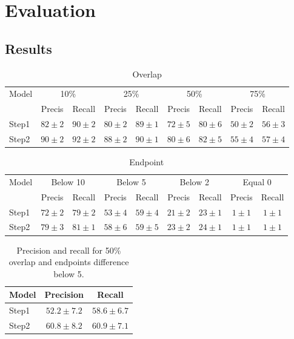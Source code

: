 \section{Evaluation}

\subsection{Results}

\begin{table}
	\centering 
	\begin{tabular}{l|c|c|c|c|c|c|c|c} 
		Model & \multicolumn{2}{|c}{10\%}& \multicolumn{2}{|c}{25\%}& \multicolumn{2}{|c}{50\%}& \multicolumn{2}{|c}{75\%}\\ 
		& Precis & Recall & Precis & Recall & Precis & Recall & Precis & Recall \\ \hline 
		Step1 & $ 82 \pm 2 $ & $ 90 \pm 2 $ & $ 80 \pm 2 $ & $ 89 \pm 1 $ & $ 72 \pm 5 $ & $ 80 \pm 6 $ & $ 50 \pm 2 $ & $ 56 \pm 3 $ \\ 
		Step2 & $ 90 \pm 2 $ & $ 92 \pm 2 $ & $ 88 \pm 2 $ & $ 90 \pm 1 $ & $ 80 \pm 6 $ & $ 82 \pm 5 $ & $ 55 \pm 4 $ & $ 57 \pm 4 $ \\ 
	\end{tabular}
	\caption{Overlap}
	\label{tab:overlap}
\end{table}

\begin{table}
	\centering 
	\begin{tabular}{l|c|c|c|c|c|c|c|c} 
		Model & \multicolumn{2}{|c}{Below 10}& \multicolumn{2}{|c}{Below 5}& \multicolumn{2}{|c}{Below 2}& \multicolumn{2}{|c}{Equal 0}\\ 
		& Precis & Recall & Precis & Recall & Precis & Recall & Precis & Recall \\ \hline 
		Step1 & $ 72 \pm 2 $ & $ 79 \pm 2 $ & $ 53 \pm 4 $ & $ 59 \pm 4 $ & $ 21 \pm 2 $ & $ 23 \pm 1 $ & $  1 \pm 1 $ & $  1 \pm 1 $ \\ 
		Step2 & $ 79 \pm 3 $ & $ 81 \pm 1 $ & $ 58 \pm 6 $ & $ 59 \pm 5 $ & $ 23 \pm 2 $ & $ 24 \pm 1 $ & $  1 \pm 1 $ & $  1 \pm 1 $ \\ 
	\end{tabular}
	\caption{Endpoint}
	\label{tab:endpoint}
\end{table}

\begin{table}
	\centering 
	\begin{tabular}{l|c|c} 
		Model & Precision & Recall \\ \hline 
		Step1 & $52.2 \pm 7.2$ & $58.6 \pm 6.7$ \\ 
		Step2 & $60.8 \pm 8.2$ & $60.9 \pm 7.1$ \\ 
	\end{tabular}
    \caption{Precision and recall for 50\% overlap and endpoints difference below 5.}
	\label{tab:pr25}
\end{table}

